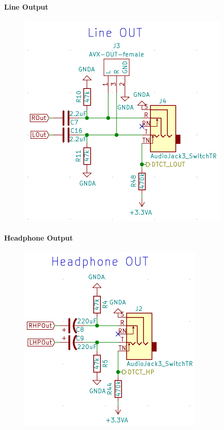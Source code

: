 \paragraph{Line Output}
\label{par:LineOUT}

\begin{figure} [H]
\begin{center}
 \includegraphics[scale=0.5]{../graphics/Schema_LineOUT.png}
\caption{}
\label{fig:Schema_LineOUT}
\end{center}
\end{figure}


\paragraph{Headphone Output}
\label{par:HPOUT}


\begin{figure} [H]
\begin{center}
 \includegraphics[scale=0.5]{../graphics/Schema_HPOUT.png}\caption{}
\label{fig:Schema_HPOUT}
\end{center}
\end{figure}




